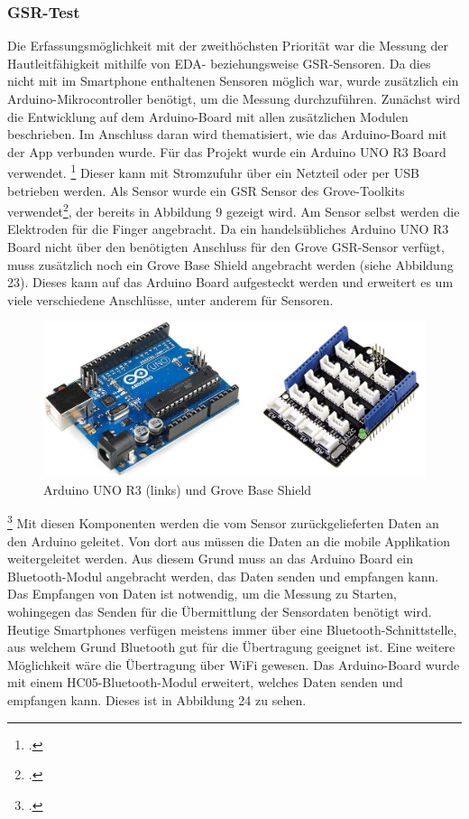 \subsubsection{GSR-Test}
Die Erfassungsmöglichkeit mit der zweithöchsten Priorität war die Messung der Hautleitfähigkeit mithilfe von EDA- beziehungsweise GSR-Sensoren. Da dies nicht mit im Smartphone enthaltenen Sensoren möglich war, wurde zusätzlich ein Arduino-Mikrocontroller benötigt, um die Messung durchzuführen. Zunächst wird die Entwicklung auf dem Arduino-Board mit allen zusätzlichen Modulen beschrieben. Im Anschluss daran wird thematisiert, wie das Arduino-Board mit der App verbunden wurde. \newline
Für das Projekt wurde ein Arduino UNO R3 Board verwendet. \footcite[Vgl.][]{Ard18} Dieser kann mit Stromzufuhr über ein Netzteil oder per USB betrieben werden. Als Sensor wurde ein GSR Sensor des Grove-Toolkits verwendet\footcite[Vgl.][]{Gro18}, der bereits in Abbildung 9 gezeigt wird. Am Sensor selbst werden die Elektroden für die Finger angebracht. Da ein handelsübliches Arduino UNO R3 Board nicht über den benötigten Anschluss für den Grove GSR-Sensor verfügt, muss zusätzlich noch ein Grove Base Shield angebracht werden (siehe Abbildung 23). Dieses kann auf das Arduino Board aufgesteckt werden und erweitert es um viele verschiedene Anschlüsse, unter anderem für Sensoren.
\begin{figure}[h]
	\centering
	\includegraphics[width=16cm]{Bilder/arduino.jpg}
	\caption[Arduino UNO R3 (links) und Grove Base Shield]{Arduino UNO R3 (links) und Grove Base Shield\footnotemark}
\end{figure}%
\footcitetext[Bilder von:][]{Sou18, Rei18}
\newline
Mit diesen Komponenten werden die vom Sensor zurückgelieferten Daten an den Arduino geleitet. Von dort aus müssen die Daten an die mobile Applikation weitergeleitet werden. Aus diesem Grund muss an das Arduino Board ein Bluetooth-Modul angebracht werden, das Daten senden und empfangen kann. Das Empfangen von Daten ist notwendig, um die Messung zu Starten, wohingegen das Senden für die Übermittlung der Sensordaten benötigt wird. Heutige Smartphones verfügen meistens immer über eine Bluetooth-Schnittstelle, aus welchem Grund Bluetooth gut für die Übertragung geeignet ist. Eine weitere Möglichkeit wäre die Übertragung über WiFi gewesen. Das Arduino-Board wurde mit einem HC05-Bluetooth-Modul erweitert, welches Daten senden und empfangen kann. Dieses ist in Abbildung 24 zu sehen.
